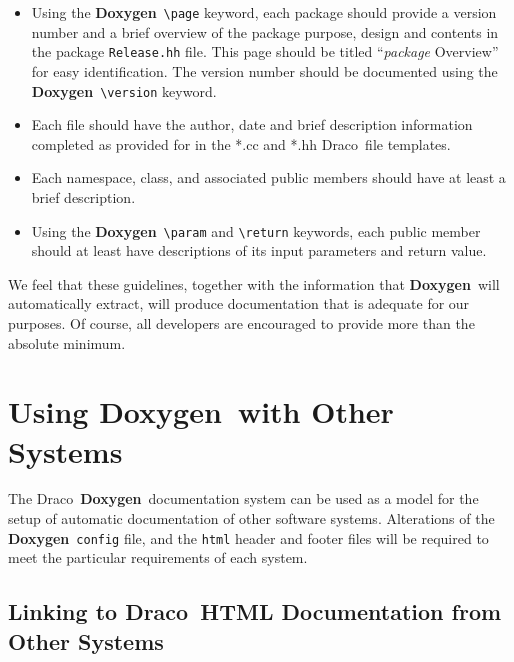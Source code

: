 \documentclass[11pt]{nmemo}
\newcommand{\draco}{{\normalfont\sffamily Draco}}
\newcommand{\doxy}{{\normalfont\bfseries Doxygen}}
\begin{document}
\begin{itemize}
 \item Using the \doxy\
  \verb+\page+ keyword, each package should provide a version number and
  a brief overview of the package purpose, design and contents in the package
  \texttt{Release.hh} file. This page should be titled ``{\em package} Overview''
  for easy identification. The version number should be documented using
  the \doxy\ \verb+\version+ keyword.
 \item Each file should have the author, date and brief description
  information completed as provided for in the *.cc and *.hh \draco\ 
  file templates.
 \item Each namespace, class, and associated public members
  should have at least a brief description.
 \item Using the \doxy\ \verb+\param+ and \verb+\return+ keywords,
  each public member should at least have descriptions of its input
  parameters and return value.
\end{itemize}

We feel that these guidelines, together with the information that
\doxy\ will automatically extract, will produce documentation that is
adequate for our purposes. Of course, all developers are 
encouraged to provide more than the absolute minimum.


\section{Using \doxy\ with Other Systems}

The \draco\ \doxy\ documentation system can be used as a model for
the setup of automatic documentation of other software systems. 
Alterations of 
the \doxy\ \texttt{config} file, and
the \texttt{html} header and footer files will be required to meet
the particular requirements of each system.


\subsection{Linking to \draco\ HTML Documentation from Other Systems}
\end{document}
